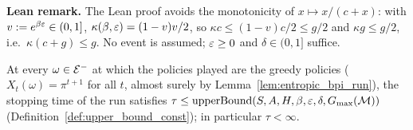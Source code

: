 \textbf{Lean remark.} The Lean proof avoids the monotonicity of $x \mapsto x/(c + x)$: with $v := e^{\beta\varepsilon} \in (0, 1]$,
$\kappa(\beta, \varepsilon) = (1 - v)v/2$, so $\kappa c \le (1 - v)c/2 \le g/2$ and $\kappa g \le g/2$, i.e.\ $\kappa(c + g) \le g$.
No event is assumed; $\varepsilon \ge 0$ and $\delta \in (0, 1]$ suffice.

\begin{lemma}\label{lem:stopping_time_bound_neg}
\leanok
{}
At every $\omega \in \mathcal{E}^-$ at which the policies played are the greedy policies
($X_t(\omega) = \pi^{t+1}$ for all $t$, almost surely by Lemma~\ref{lem:entropic_bpi_run}), the stopping time of
the run satisfies
$\tau \le \mathrm{upperBound}(S, A, H, \beta, \varepsilon, \delta, G_{\max}(\mathcal M))$ (Definition~\ref{def:upper_bound_const});
in particular $\tau < \infty$.
\end{lemma}

